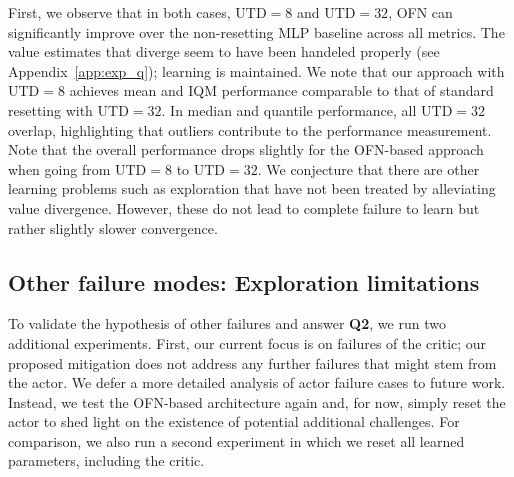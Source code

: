 First, we observe that in both cases, $\mathrm{UTD}=8$ and $\mathrm{UTD}=32$, OFN can significantly improve over the non-resetting MLP baseline across all metrics. The value estimates that diverge seem to have been handeled properly (see Appendix~\ref{app:exp_q}); learning is maintained. We note that our approach with $\mathrm{UTD}=8$ achieves mean and IQM performance comparable to that of standard resetting with $\mathrm{UTD}=32$. In median and quantile performance, all $\mathrm{UTD}=32$ overlap, highlighting that outliers contribute to the performance measurement. Note that the overall performance drops slightly for the OFN-based approach when going from $\mathrm{UTD}=8$ to $\mathrm{UTD}=32$. We conjecture that there are other learning problems such as exploration that have not been treated by alleviating value divergence. However, these do not lead to complete failure to learn but rather slightly slower convergence. %

\subsection{Other failure modes: Exploration limitations} \label{sec:otherfailure}


To validate the hypothesis of other failures and answer \textbf{Q2}, we run two additional experiments. First, our current focus is on failures of the critic; our proposed mitigation does not address any further failures that might stem from the actor. We defer a more detailed analysis of actor failure cases to future work. Instead, we test the OFN-based architecture again and, for now, simply reset the actor to shed light on the existence of potential additional challenges.
For comparison, we also run a second experiment in which we reset all learned parameters, including the critic.

